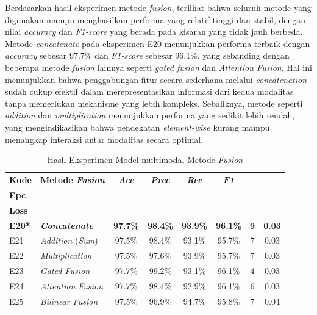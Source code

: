 Berdasarkan hasil eksperimen metode \textit{fusion}, terlihat bahwa seluruh metode yang digunakan mampu menghasilkan performa yang relatif tinggi dan stabil, dengan nilai \textit{accuracy} dan \textit{F1-score} yang berada pada kisaran yang tidak jauh berbeda. Metode \textit{concatenate} pada eksperimen E20 menunjukkan performa terbaik dengan \textit{accuracy} sebesar 97.7\% dan \textit{F1-score} sebesar 96.1\%, yang sebanding dengan beberapa metode \textit{fusion} lainnya seperti \textit{gated fusion} dan \textit{Attention Fusion}. Hal ini menunjukkan bahwa penggabungan fitur secara sederhana melalui \textit{concatenation} sudah cukup efektif dalam merepresentasikan informasi dari kedua modalitas tanpa memerlukan mekanisme yang lebih kompleks. Sebaliknya, metode seperti \textit{addition} dan \textit{multiplication} menunjukkan performa yang sedikit lebih rendah, yang mengindikasikan bahwa pendekatan \textit{element-wise} kurang mampu menangkap interaksi antar modalitas secara optimal.


\begin{table}[H]
    \centering
    \caption{Hasil Eksperimen Model multimodal Metode \textit{Fusion}}
    \label{table:4.multimodal_fusion}
    \footnotesize 
    \setlength{\tabcolsep}{7pt} 
    \renewcommand{\arraystretch}{1.1} %
    

        \begin{tabular}{llcccccc}
            \hline
            \textbf{Kode} & \textbf{Metode \textit{Fusion}} & \textbf{\textit{Acc}} & \textbf{\textit{Prec}} & \textbf{\textit{Rec}} & \textbf{\textit{F1}} & \shortstack{\textbf{Best}\\\textbf{Epc}} & \shortstack{\textbf{Val}\\\textbf{Loss}} \\
            \hline
            \textbf{E20*} & \textbf{\textit{Concatenate}} & \textbf{97.7\%} & \textbf{98.4\%} & \textbf{93.9\%} & \textbf{96.1\%} & \textbf{9} & \textbf{0.03} \\
            E21 & \textit{Addition} (\textit{Sum}) & 97.5\% & 98.4\% & 93.1\% & 95.7\% & 7 & 0.03 \\
            E22 & \textit{Multiplication} & 97.5\% & 97.6\% & 93.9\% & 95.7\% & 7 & 0.03 \\
            E23 & \textit{Gated Fusion} & 97.7\% & 99.2\% & 93.1\% & 96.1\% & 4 & 0.03 \\
            E24 & \textit{Attention Fusion} & 97.7\% & 98.4\% & 92.9\% & 96.1\% & 6 & 0.03 \\
            E25 & \textit{Bilinear Fusion} & 97.5\% & 96.9\% & 94.7\% & 95.8\% & 7 & 0.04 \\
            \hline
        \end{tabular}
    
\end{table}


